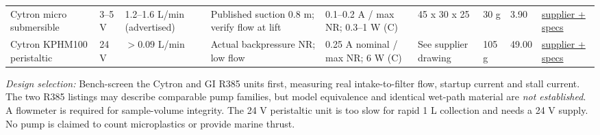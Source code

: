 \documentclass[10pt,a4paper]{article}
\begin{document}
\begin{landscape}
\begin{longtable}{@{}L{29mm}L{20mm}L{27mm}L{30mm}L{34mm}L{29mm}L{17mm}L{15mm}L{29mm}@{}}
Cytron micro submersible & 3--5 V & 1.2--1.6 L/min (advertised) & Published suction 0.8 m; verify flow at lift & 0.1--0.2 A / max NR; 0.3--1 W (C) & 45 x 30 x 25 & 30 g & 3.90 & \href{https://my.cytron.io/p-micro-submersible-water-pump-dc-3v-5v}{supplier + specs}\\
Cytron KPHM100 peristaltic & 24 V & $>0.09$ L/min & Actual backpressure NR; low flow & 0.25 A nominal / max NR; 6 W (C) & See supplier drawing & 105 g & 49.00 & \href{https://my.cytron.io/p-24v-peristaltic-dosing-pump}{supplier + specs}\\
\end{longtable}
\textit{Design selection:} Bench-screen the Cytron and GI R385 units first, measuring real intake-to-filter flow, startup current and stall current. The two R385 listings may describe comparable pump families, but model equivalence and identical wet-path material are \emph{not established}. A flowmeter is required for sample-volume integrity. The 24 V peristaltic unit is too slow for rapid 1 L collection and needs a 24 V supply. No pump is claimed to count microplastics or provide marine thrust.
\end{landscape}
\end{document}
